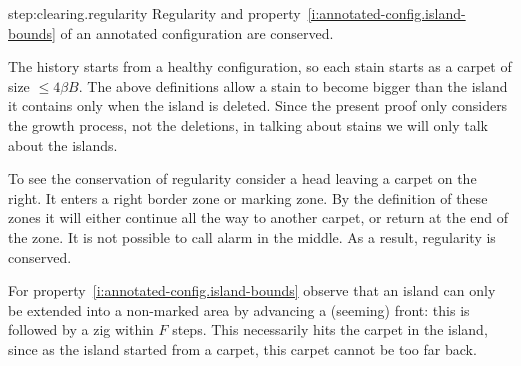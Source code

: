 \documentclass[12pt]{memoir}
\renewcommand{\le}{\leq}
\def\B{B}
\newcommand{\F}{F}
\newcommand{\cns}[1]{c_{\textrm{\upshape #1}}}
\begin{document}
\begin{Proof}
\begin{step+}{step:clearing.regularity}
Regularity and property~\ref{i:annotated-config.island-bounds} of
an annotated configuration are conserved.
\end{step+}
\begin{pproof}
The history starts from a healthy configuration, so each stain starts as a carpet
of size \( \le 4\beta\B \).
The above definitions allow a stain to become bigger than the
island it contains only when the island is deleted.
Since the present proof only considers the growth process, not the deletions,
in talking about stains we will only talk about the islands.

To see the conservation of regularity consider a head leaving a carpet on the right.
It enters a right border zone or marking zone.
By the definition of these zones it will either continue all the way to another carpet,
or return at the end of the zone.
It is not possible to call alarm in the middle.
As a result, regularity is conserved.

For property~\ref{i:annotated-config.island-bounds} observe that an island can
only be extended into a non-marked area
by advancing a (seeming) front: this is followed by a zig within \( \F \) steps.
This necessarily hits the carpet in the island, since as the island started from a
carpet, this carpet cannot be too far back.





\end{pproof}
\end{Proof}
\end{document}
